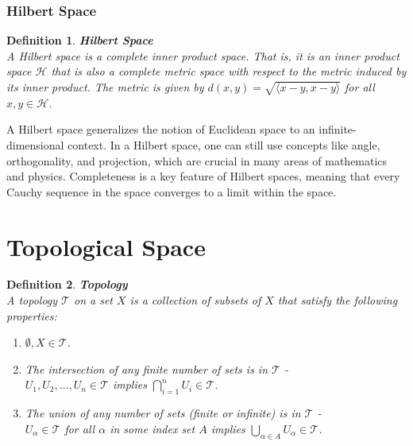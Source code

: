 \documentclass[11pt]{book} %
\newtheorem{definition}{Definition}[section]
\begin{document}
\subsubsection{Hilbert Space}

\begin{definition}{\textbf{Hilbert Space}} \\
    A \emph{Hilbert space} is a complete inner product space. That is, it is an inner product space \( \mathcal{H} \) that 
    is also a complete metric space with respect to the metric induced by its inner product. 
    The metric is given by \( d(x,y) = \sqrt{\langle x-y, x-y \rangle} \) for all \( x, y \in \mathcal{H} \).
\end{definition}
    
A Hilbert space generalizes the notion of Euclidean space to an infinite-dimensional context. 
In a Hilbert space, one can still use concepts like angle, orthogonality, and projection, which are crucial in many areas of mathematics and physics. 
Completeness is a key feature of Hilbert spaces, meaning that every Cauchy sequence in the space converges to a limit within the space. 
    



\section{Topological Space}

\begin{definition}{\textbf{Topology}} \\
A topology \( \mathcal{T} \) on a set \( X \) is a collection of subsets of  \( X \) that satisfy the following properties:
\begin{enumerate}
    \item \( \emptyset, X \in \mathcal{T} \).
    \item The intersection of any finite number of sets is in \( \mathcal{T} \) - \\ 
    \( U_1, U_2, \ldots, U_n \in \mathcal{T} \) implies \( \bigcap_{i=1}^n U_i \in \mathcal{T} \).
    \item The union of any number of sets (finite or infinite) is in \( \mathcal{T} \) - \\
    \( U_\alpha \in \mathcal{T} \) for all \( \alpha \) in some index set \( A \) implies \( \bigcup_{\alpha \in A} U_\alpha \in \mathcal{T} \).
\end{enumerate}
\end{definition}
\end{document}
